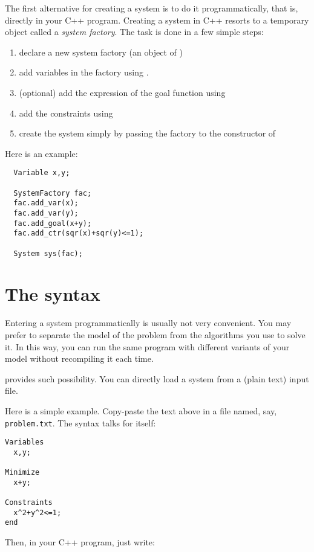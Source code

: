 The first alternative for creating a system is to do it programmatically, that is, directly in your C++ program.
Creating a system in C++ resorts to a temporary object called a {\it system factory}. The task is done in a few simple steps:
\begin{enumerate}
\item declare a new system factory (an object of )
\item add variables in the factory using .
\item (optional) add the expression of the goal function using 
\item add the constraints using 
\item create the system simply by passing the factory to the constructor of 
\end{enumerate}

Here is an example:

\begin{lstlisting}
  Variable x,y;

  SystemFactory fac;
  fac.add_var(x);
  fac.add_var(y);
  fac.add_goal(x+y);
  fac.add_ctr(sqr(x)+sqr(y)<=1);

  System sys(fac);
\end{lstlisting}

\section{The \quimper syntax}\label{sec:mod-sys-load}

Entering a system programmatically is usually not very convenient.
You may prefer to separate the model of the problem from the algorithms
you use to solve it. In this way, you can run the same program with different
variants of your model without recompiling it each time.

\ibex provides such possibility. You can directly load a system from a (plain text) input file.

Here is a simple example. Copy-paste the text above in a file named, say, {\tt problem.txt}. 
The syntax talks for itself:

\begin{verbatim}
Variables
  x,y;

Minimize
  x+y;

Constraints
  x^2+y^2<=1;
end
\end{verbatim}

Then, in your C++ program, just write:

